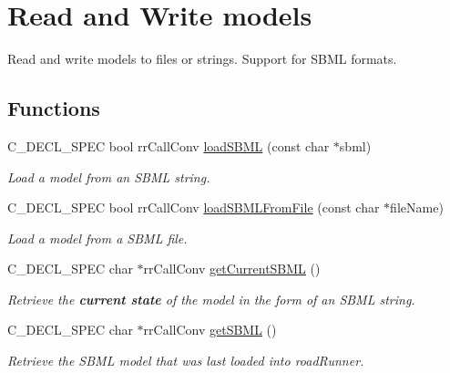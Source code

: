 \hypertarget{group__loadsave}{
\section{\-Read and \-Write models}
\label{group__loadsave}
}


\-Read and write models to files or strings. \-Support for \-S\-B\-M\-L formats.  


\subsection*{\-Functions}
\begin{DoxyCompactItemize}
\item 
\-C\-\_\-\-D\-E\-C\-L\-\_\-\-S\-P\-E\-C bool rr\-Call\-Conv \hyperlink{group__loadsave_ga4105f02dfdb959175f30cecebfb1c081}{load\-S\-B\-M\-L} (const char $\ast$sbml)
\begin{DoxyCompactList}\small\item\em \-Load a model from an \-S\-B\-M\-L string. \end{DoxyCompactList}\item 
\-C\-\_\-\-D\-E\-C\-L\-\_\-\-S\-P\-E\-C bool rr\-Call\-Conv \hyperlink{group__loadsave_gae4aa1daa0773e256698353861e3d1ef3}{load\-S\-B\-M\-L\-From\-File} (const char $\ast$file\-Name)
\begin{DoxyCompactList}\small\item\em \-Load a model from a \-S\-B\-M\-L file. \end{DoxyCompactList}\item 
\-C\-\_\-\-D\-E\-C\-L\-\_\-\-S\-P\-E\-C char $\ast$rr\-Call\-Conv \hyperlink{group__loadsave_gade5df220f410e86123128a2b617b6ec5}{get\-Current\-S\-B\-M\-L} ()
\begin{DoxyCompactList}\small\item\em \-Retrieve the {\bfseries current state} of the model in the form of an \-S\-B\-M\-L string. \end{DoxyCompactList}\item 
\-C\-\_\-\-D\-E\-C\-L\-\_\-\-S\-P\-E\-C char $\ast$rr\-Call\-Conv \hyperlink{group__loadsave_ga05a79ded419b52fa2965fce1700c0e82}{get\-S\-B\-M\-L} ()
\begin{DoxyCompactList}\small\item\em \-Retrieve the \-S\-B\-M\-L model that was last loaded into road\-Runner. \end{DoxyCompactList}\end{DoxyCompactItemize}


